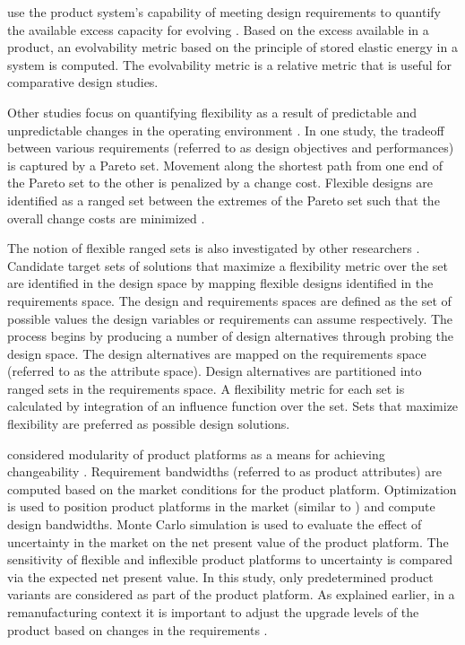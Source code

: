 \citeauthor{Tackett2014} use the product system's capability of meeting design requirements to quantify the available excess capacity for evolving \cite{Tackett2014}. Based on the excess available in a product, an evolvability metric based on the principle of stored elastic energy in a system is computed. The evolvability metric is a relative metric that is useful for comparative design studies.

Other studies focus on quantifying flexibility as a result of predictable and unpredictable changes in the operating environment \cite{Olewnik2004,Liu2008}. In one study, the tradeoff between various requirements (referred to as design objectives and performances) is captured by a Pareto set. Movement along the shortest path from one end of the Pareto set to the other is penalized by a change cost. Flexible designs are identified as a ranged set between the extremes of the Pareto set such that the overall change costs are minimized \cite{Olewnik2004}.

The notion of flexible ranged sets is also investigated by other researchers \cite{Liu2008}. Candidate target sets of solutions that maximize a flexibility metric over the set are identified in the design space by mapping flexible designs identified in the requirements space. The design and requirements spaces are defined as the set of possible values the design variables or requirements can assume respectively. The process begins by producing a number of design alternatives through probing the design space. The design alternatives are mapped on the requirements space (referred to as the attribute space). Design alternatives are partitioned into ranged sets in the requirements space. A flexibility metric for each set is calculated by integration of an influence function over the set. Sets that maximize flexibility are preferred as possible design solutions.

\citeauthor{Suh2007} considered {modularity} of product platforms as a means for achieving changeability \cite{Suh2007}. Requirement bandwidths (referred to as product attributes) are computed based on the market conditions for the product platform. Optimization is used to position product platforms in the market (similar to \citeauthor{Kwak2013} \cite{Kwak2013}) and compute design bandwidths. Monte Carlo simulation is used to evaluate the effect of uncertainty in the market on the net present value of the product platform. The sensitivity of flexible and inflexible product platforms to uncertainty is compared via the expected net present value. In this study, only predetermined product variants are considered as part of the product platform. As explained earlier, in a remanufacturing context it is important to adjust the upgrade levels of the product based on changes in the requirements \cite{Kwak2013}.


